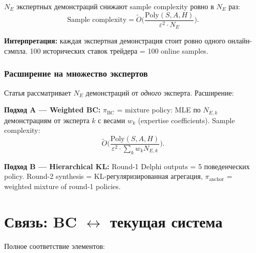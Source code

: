 $N_E$ экспертных демонстраций снижают sample complexity ровно в $N_E$ раз:
\begin{equation}
\label{eq:demo_reg}
\text{Sample complexity} = \widetilde{O}\!\biggl(\frac{\mathrm{Poly}(S, A, H)}{\varepsilon^2 \cdot N_E}\biggr).
\end{equation}

\textbf{Интерпретация:} каждая экспертная демонстрация стоит ровно
одного онлайн-сэмпла. 100 исторических ставок трейдера = 100 online samples.

\subsubsection{Расширение на множество экспертов}

Статья рассматривает $N_E$ демонстраций от \emph{одного} эксперта.
Расширение:

\textbf{Подход A --- Weighted BC:}
$\pi_{\mathrm{BC}}$ = mixture policy: MLE по $N_{E,k}$ демонстрациям от эксперта $k$
с весами $w_k$ (expertise coefficients).
Sample complexity:
\[
\widetilde{O}\!\biggl(\frac{\mathrm{Poly}(S,A,H)}{\varepsilon^2 \cdot \sum_k w_k N_{E,k}}\biggr).
\]

\textbf{Подход B --- Hierarchical KL:}
Round-1 Delphi outputs = 5 поведенческих policy.
Round-2 synthesis = KL-регуляризированная агрегация,
$\pi_{\mathrm{anchor}}$ = weighted mixture of round-1 policies.

\section{Связь: BC $\leftrightarrow$ текущая система}
\label{sec:bridge}

Полное соответствие элементов:

